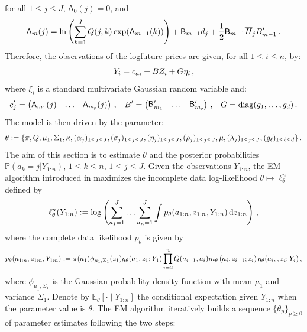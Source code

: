 for all $1\le j\le J$, $\mathsf{A}_0(j) = 0$,  and
\begin{equation*}
\mathsf{A}_m(j) = \ln \left(\sum^J_{k=1} Q(j,k) \exp(\mathsf{A}_{m-1}(k)) \right) + \mathsf{B}_{m-1} d_j + \frac{1}{2} \mathsf{B}_{m-1} \overline{H}_j B'_{m-1}\,.
\end{equation*}
Therefore, the observations of the  logfuture prices are given, for all $1\le i\le n$, by:
\[
Y_i = c_{a_i} + B Z_i + G \eta_i\,,
\]
where $\xi_i$ is a standard multivariate Gaussian random variable and:
\[
c_{j}' = \begin{pmatrix} \mathsf{A}_{m_1}(j) & \ldots & \mathsf{A}_{m_{\mathsf{p}}}(j) \end{pmatrix}\,,
\;\;\;
B' = \begin{pmatrix}\mathsf{B}_{m_1}' &  \ldots & \mathsf{B}_{m_{\mathsf{p}}}' \end{pmatrix}\,, \;\;\;
G = \mathrm{diag}(g_1, \ldots , g_{d} )\,.
\]
The model is then driven by the parameter:
\[
\theta := \{\pi, Q, \mu_1, \Sigma_1, \kappa, (\alpha_j)_{1\leq j\leq J}, (\sigma_j)_{1\leq j\leq J}, (\eta_j)_{1\leq j\leq J}, (\rho_j)_{1\leq j\leq J}, \mu, (\lambda_j)_{1\leq j\leq J}, (g_{\ell})_{1\leq \ell\leq d} \}\,.
\]
The aim of this section is to estimate $\theta$ and the posterior probabilities $\mathbb{P}(a_k=j|Y_{1:n})$, $1\le k \le n$, $1\le j \le J$. Given the observations $Y_{1:n}$, the EM algorithm introduced in \cite{dempster:laird:rubin:1977} maximizes the incomplete data log-likelihood $\theta\mapsto \ell_{\theta}^{n}$ defined by
\begin{equation*}
\ell_{\theta}^{n}(Y_{1:n}) := \log\left(\sum_{a_1=1}^J\ldots\sum_{a_n=1}^J\int p_{\theta}(a_{1:n},z_{1:n},Y_{1:n})\,\mathrm{d} z_{1:n}\right)\,,
\end{equation*}
where the complete data likelihood $p_{\theta}$ is given by
\begin{equation*}
p_{\theta}(a_{1:n},z_{1:n},Y_{1:n}) := \pi(a_1)\phi_{\mu_1,\Sigma_1}(z_1)g_{\theta}(a_1,z_1;Y_1)\prod^{n}_{i=2}Q(a_{i-1},a_i)m_{\theta}\left(a_{i},z_{i-1};z_i\right)g_{\theta}(a_i,,z_i;Y_i)\,,
\end{equation*}
where $\phi_{\mu_1,\Sigma_1}$ is the Gaussian probability density function with mean $\mu_1$ and variance $\Sigma_1$.
Denote by $\mathbb{E}_{\theta}\left[\cdot\middle|Y_{1:n}\right]$  the conditional expectation given $Y_{1:n}$ when the parameter value is $\theta$. The EM algorithm iteratively builds a sequence $\{\theta_{p}\}_{p\ge 0}$ of parameter estimates following the two steps:
